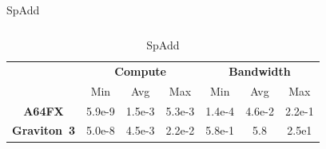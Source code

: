 \begin{table}[htbp!]
\begin{subtable}{\linewidth}
\begin{tabular}{c|ccc|ccc}
\bottomrule
\end{tabular}
\end{subtable}

\vspace{0.5em}

\begin{subtable}{\linewidth}
\centering
\caption{SpAdd}
\begin{tabular}{c|ccc|ccc}
\toprule
& \multicolumn{3}{c|}{\textbf{Compute}} & \multicolumn{3}{c}{\textbf{Bandwidth}} \\
& Min & Avg & Max & Min & Avg & Max \\
\midrule

\textbf{A64FX} & 5.9e-9 & 1.5e-3 & 5.3e-3 & 1.4e-4 & 4.6e-2 & 2.2e-1 \\
\textbf{Graviton~3} & 5.0e-8 & 4.5e-3 & 2.2e-2 & 5.8e-1 & 5.8 & 2.5e1 \\

\bottomrule
\end{tabular}
\end{subtable}

\end{table}
